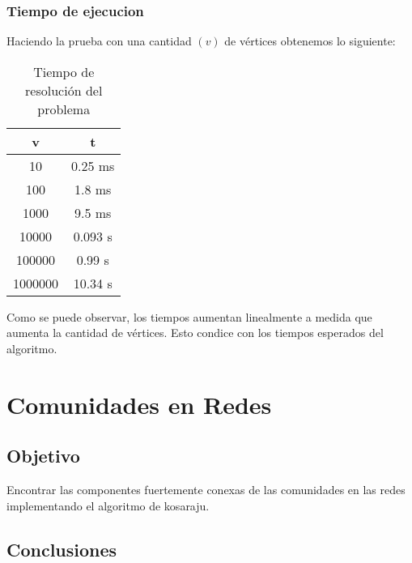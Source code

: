 \documentclass{article}
\begin{document}
            \subsubsection{Tiempo de ejecucion}
                Haciendo la prueba con una cantidad $(v)$ de vértices obtenemos lo siguiente:
                \begin{table}[h!]
                    \centering
                    \caption{Tiempo de resolución del problema}
                    \begin{tabular}{c|c}
                        v & t \\
                        \hline
                        10 & 0.25 ms \\
                        \hline
                        100 & 1.8 ms \\
                        \hline
                        1000 & 9.5 ms \\
                        \hline
                        10000 & 0.093 s \\
                        \hline
                        100000 & 0.99 s \\
                        \hline
                        1000000 & 10.34 s
                    \end{tabular}
                \end{table}

                Como se puede observar, los tiempos aumentan linealmente a medida
                que aumenta la cantidad de vértices. Esto condice con los tiempos
                esperados del algoritmo.


    \section{Comunidades en Redes}
        \subsection{Objetivo}
          Encontrar las componentes fuertemente conexas de las comunidades en las
          redes implementando el algoritmo de kosaraju.
        \subsection{Conclusiones}
\end{document}
